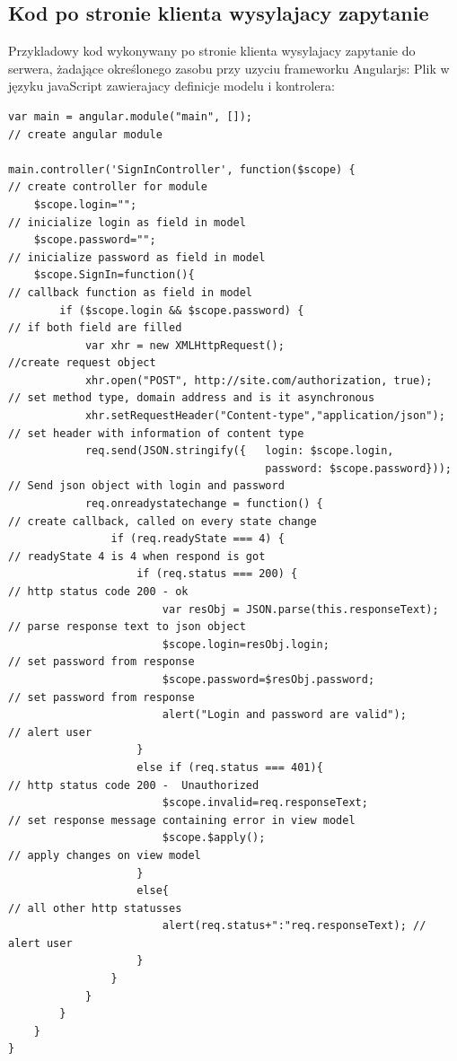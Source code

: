 \documentclass[12pt]{report}
\begin{document}
\subsection{Kod po stronie klienta wysylajacy zapytanie}
Przykladowy kod wykonywany po stronie klienta wysylajacy zapytanie do serwera, żadające określonego zasobu przy uzyciu frameworku Angularjs:
Plik w języku javaScript zawierajacy definicje modelu i kontrolera:
\medskip
\begin{lstlisting}
var main = angular.module("main", []); 									// create angular module

main.controller('SignInController', function($scope) { 					// create controller for module
	$scope.login=""; 													// inicialize login as field in model
	$scope.password=""; 												// inicialize password as field in model
	$scope.SignIn=function(){ 											// callback function as field in model
		if ($scope.login && $scope.password) {							// if both field are filled
			var xhr = new XMLHttpRequest();									//create request object
			xhr.open("POST", http://site.com/authorization, true);		// set method type, domain address and is it asynchronous
			xhr.setRequestHeader("Content-type","application/json");	// set header with information of content type
			req.send(JSON.stringify({	login: $scope.login,			
										password: $scope.password})); 	// Send json object with login and password
			req.onreadystatechange = function() { 						// create callback, called on every state change
				if (req.readyState === 4) { 							// readyState 4 is 4 when respond is got
					if (req.status === 200) { 							// http status code 200 - ok
						var resObj = JSON.parse(this.responseText);		// parse response text to json object
						$scope.login=resObj.login;						// set password from response
						$scope.password=$resObj.password;				// set password from response
						alert("Login and password are valid");			// alert user
					}
					else if (req.status === 401){						// http status code 200 -  Unauthorized
						$scope.invalid=req.responseText;  				// set response message containing error in view model
						$scope.$apply(); 								// apply changes on view model
					}
					else{ 												// all other http statusses
						alert(req.status+":"req.responseText); // alert user
					}
				}
			}
		}
	}
}
\end{lstlisting}
\end{document}
